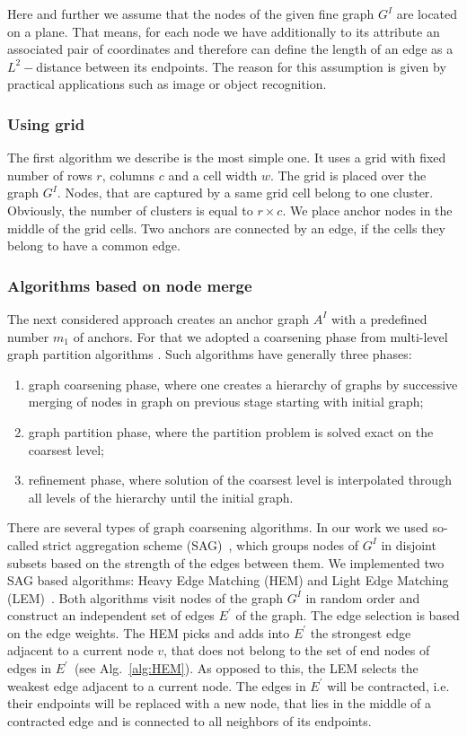 Here and further we assume that the nodes of the given fine graph $G^I$ are located on a plane. That means, for each node we have additionally to its attribute an associated pair of coordinates and therefore can define the length of an edge as a $L^2-$distance between its endpoints. The reason for this assumption is given by practical applications such as image or object recognition.
\subsubsection{Using grid}	
The first algorithm we describe is the most simple one. It uses a grid with fixed number of rows $r$, columns $c$ and a cell width $w$. The grid is placed over the graph $G^I$. Nodes, that are captured by a same grid cell belong to one cluster. Obviously, the number of clusters is equal to $r\times c$. We place anchor nodes in the middle of the grid cells. Two anchors are connected by an edge, if the cells they belong to have a common edge.
\subsubsection{Algorithms based on node merge}
The next considered approach creates an anchor graph $A^I$ with a predefined number $m_1$ of anchors. For that we adopted a coarsening phase from multi-level graph partition algorithms \cite{Chevalier09_GP, Safro2012_GC, Karypis95_GP, Hendrickson1995}.
Such algorithms have generally three phases: 
\begin{enumerate}
	\item graph coarsening phase, where one creates a hierarchy of graphs by successive merging of nodes in graph on previous stage starting with initial graph;
	\item graph partition phase, where the partition problem is solved exact on the coarsest level;
	\item refinement phase, where solution of the coarsest level is interpolated through all levels of the hierarchy until the initial graph.
\end{enumerate}
There are several types of graph coarsening algorithms. In our work we used so-called strict aggregation scheme (SAG)~\cite{Chevalier09_GP}, which groups nodes of $G^I$ in disjoint subsets based on the strength of the edges between them. We implemented two SAG based algorithms: Heavy Edge Matching (HEM) and Light Edge Matching (LEM)~\cite{Chevalier09_GP}. Both algorithms visit nodes of the graph $G^I$ in random order and construct an independent set of edges $E^\prime$ of the graph. The edge selection is based on the edge weights. The HEM picks and adds into $E^\prime$ the strongest edge adjacent to a current node $v$, that does not belong to the set of end nodes of edges in $E^\prime$~(see Alg.~\ref{alg:HEM}). As opposed to this, the LEM selects the weakest edge adjacent to a current node. The edges in $E^\prime$ will be contracted, i.e. their endpoints will be replaced with a new node, that lies in the middle of a contracted edge and is connected to all neighbors of its endpoints.

